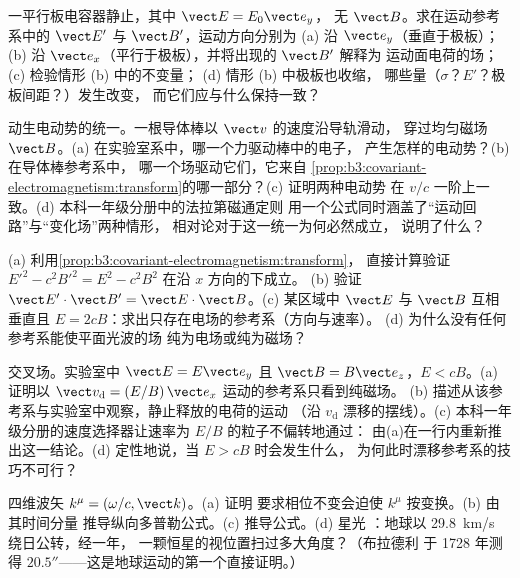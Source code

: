 \begin{exercise}[$\star$]\label{exo:b3:covariant-electromagnetism:4}
一平行板电容器静止，其中 $\vect E = E_0\vect e_y$，
无 $\vect B$。求在运动参考系中的 $\vect E'$ 与 $\vect B'$，运动方向分别为 (a)
沿 $\vect e_y$（垂直于极板）；(b) 沿 $\vect
e_x$（平行于极板），并将出现的 $\vect B'$ 解释为
运动面电荷的场；(c) 检验情形 (b) 中的不变量；
(d) 情形 (b) 中极板也收缩，
哪些量（$\sigma$？$E'$？极板间距？）发生改变，
而它们应与什么保持一致？
\end{exercise}

\begin{exercise}[$\star\star$]\label{exo:b3:covariant-electromagnetism:5}
动生电动势的统一。一根导体棒以 $\vect v$ 的速度沿导轨滑动，
穿过均匀磁场 $\vect B$。(a) 在实验室系中，哪一个力驱动棒中的电子，
产生怎样的电动势？(b) 在导体棒参考系中，
哪一个场驱动它们，它来自
\cref{prop:b3:covariant-electromagnetism:transform}的哪一部分？(c) 证明两种电动势
在 $v/c$ 一阶上一致。(d) 本科一年级分册中的法拉第磁通定则
用一个公式同时涵盖了“运动回路”与“变化场”两种情形，
相对论对于这一统一为何必然成立，
说明了什么？
\end{exercise}

\begin{exercise}[$\star\star$]\label{exo:b3:covariant-electromagnetism:6}
(a) 利用\cref{prop:b3:covariant-electromagnetism:transform}，
直接计算验证 $E'^2 - c^2B'^2 = E^2 - c^2B^2$ 在沿 $x$ 方向的下成立。
(b) 验证 $\vect E'\cdot\vect B' = \vect
E\cdot\vect B$。(c) 某区域中 $\vect E$ 与 $\vect B$
互相垂直且 $E = 2cB$：求出只存在电场的参考系（方向与速率）。
(d) 为什么没有任何参考系能使平面光波的场
纯为电场或纯为磁场？
\end{exercise}

\begin{exercise}[$\star\star$]\label{exo:b3:covariant-electromagnetism:7}
交叉场。实验室中 $\vect E = E\vect e_y$ 且 $\vect B =
B\vect e_z$，$E < cB$。(a) 证明以
$\vect v_{\text{d}} = (E/B)\,\vect e_x$ 运动的参考系只看到纯磁场。
(b) 描述从该参考系与实验室中观察，静止释放的电荷的运动
（沿 $v_{\text{d}}$ 漂移的摆线）。(c)
本科一年级分册的速度选择器让速率为 $E/B$ 的粒子不偏转地通过：
由(a)在一行内重新推出这一结论。(d) 定性地说，当 $E > cB$
时会发生什么，
为何此时漂移参考系的技巧不可行？
\end{exercise}

\begin{exercise}[$\star\star$]\label{exo:b3:covariant-electromagnetism:8}
四维波矢 $k^\mu = (\omega/c, \vect k)$。(a) 证明
要求相位不变会迫使 $k^\mu$ 按变换。(b) 由其时间分量
推导纵向多普勒公式。(c) 推导公式。(d) 星光
：地球以 \qty{29.8}{km/s} 绕日公转，经一年，
一颗恒星的视位置扫过多大角度？（布拉德利
于 1728 年测得
$20.5''$——这是地球运动的第一个直接证明。）
\end{exercise}

